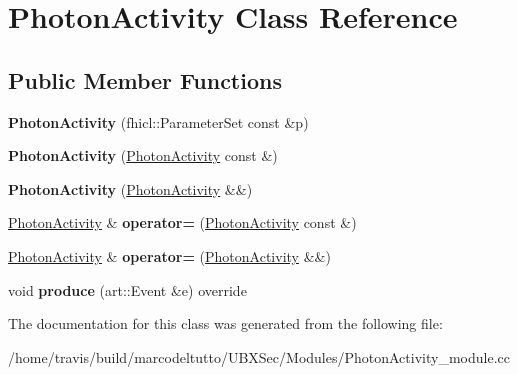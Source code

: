 \hypertarget{classPhotonActivity}{\section{\-Photon\-Activity \-Class \-Reference}
\label{classPhotonActivity}
}
\subsection*{\-Public \-Member \-Functions}
\begin{DoxyCompactItemize}
\item 
\hypertarget{classPhotonActivity_a76dfd63b90435e0b7ec3b74ee15f7ac2}{{\bfseries \-Photon\-Activity} (fhicl\-::\-Parameter\-Set const \&p)}\label{classPhotonActivity_a76dfd63b90435e0b7ec3b74ee15f7ac2}

\item 
\hypertarget{classPhotonActivity_aa6a5ff7c79512a83324a80b5a31c2d07}{{\bfseries \-Photon\-Activity} (\hyperlink{classPhotonActivity}{\-Photon\-Activity} const \&)}\label{classPhotonActivity_aa6a5ff7c79512a83324a80b5a31c2d07}

\item 
\hypertarget{classPhotonActivity_a34da9119cff858250180159f4fcaf187}{{\bfseries \-Photon\-Activity} (\hyperlink{classPhotonActivity}{\-Photon\-Activity} \&\&)}\label{classPhotonActivity_a34da9119cff858250180159f4fcaf187}

\item 
\hypertarget{classPhotonActivity_a7cf8b5b10a1f5ab6cccb432531124951}{\hyperlink{classPhotonActivity}{\-Photon\-Activity} \& {\bfseries operator=} (\hyperlink{classPhotonActivity}{\-Photon\-Activity} const \&)}\label{classPhotonActivity_a7cf8b5b10a1f5ab6cccb432531124951}

\item 
\hypertarget{classPhotonActivity_a12aba7c001a7263b0ff8f1871b94a445}{\hyperlink{classPhotonActivity}{\-Photon\-Activity} \& {\bfseries operator=} (\hyperlink{classPhotonActivity}{\-Photon\-Activity} \&\&)}\label{classPhotonActivity_a12aba7c001a7263b0ff8f1871b94a445}

\item 
\hypertarget{classPhotonActivity_ab28c536cfa704815226ef9b8f7632694}{void {\bfseries produce} (art\-::\-Event \&e) override}\label{classPhotonActivity_ab28c536cfa704815226ef9b8f7632694}

\end{DoxyCompactItemize}


\-The documentation for this class was generated from the following file\-:\begin{DoxyCompactItemize}
\item 
/home/travis/build/marcodeltutto/\-U\-B\-X\-Sec/\-Modules/\-Photon\-Activity\-\_\-module.\-cc\end{DoxyCompactItemize}
